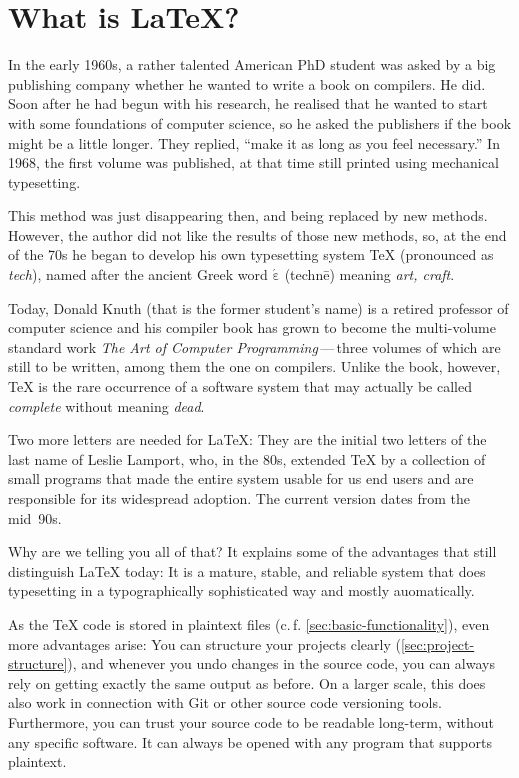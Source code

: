 \chapter{What is \LaTeX?}
\label{sec:what-is-latex}

In the early 1960s, a rather talented American PhD student was asked by a big publishing company whether he wanted to write a book on compilers.
He did.
Soon after he had begun with his research, he realised that he wanted to start with some foundations of computer science, so he asked the publishers if the book might be a little longer.
They replied, \enquote{make it as long as you feel necessary.}
In 1968, the first volume was published, at that time still printed using mechanical typesetting.

This method was just disappearing then, and being replaced by new methods.
However, the author did not like the results of those new methods, so,
at the end of the 70s he began to develop his own typesetting system \TeX
(pronounced as \emph{tech}), named after the ancient Greek word \texttau$\mathrm{\acute{\varepsilon}}$\textchi\textnu\texteta{} (technē) meaning \emph{art, craft}.

Today, Donald Knuth (that is the former student’s name) is a retired professor of computer science and his compiler book has grown to become the multi-volume standard work \emph{The Art of Computer Programming}\,—\,three volumes of which are still to be written, among them the one on compilers.
Unlike the book, however, \TeX{} is the rare occurrence of a software system that may actually be called \emph{complete} without meaning \emph{dead}.

Two more letters are needed for \LaTeX:
They are the initial two letters of the last name of Leslie Lamport, who, in the 80s, extended \TeX{} by a collection of small programs that made the entire system usable for us end users and are responsible for its widespread adoption.
The current version dates from the mid~90s.

Why are we telling you all of that?
It explains some of the advantages that still distinguish \LaTeX{} today:
It is a mature, stable, and reliable system
that does typesetting in a typographically sophisticated way and mostly auomatically.

As the \TeX{} code is stored in plaintext files (c.\,f. \cref{sec:basic-functionality}),
even more advantages arise:
You can structure your projects clearly (\cref{sec:project-structure}),
and whenever you undo changes in the source code, you can always rely on getting exactly the same output as before.
On a larger scale, this does also work in connection with Git or other source code versioning tools.
Furthermore, you can trust your source code to be readable long-term, without any specific software.
It can always be opened with any program that supports plaintext.

